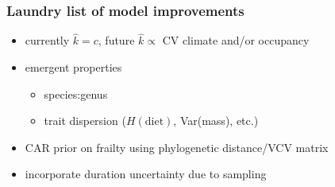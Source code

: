 \documentclass{beamer}
\begin{document}
\begin{frame}
  \frametitle{Laundry list of model improvements}

  \begin{itemize}
    \item currently \(\hat{k} = c\), future \(\hat{k} \propto\) CV climate and/or occupancy
    \item emergent properties 
      \begin{itemize}
        \item species:genus
        \item trait dispersion (\(H(\text{diet})\), Var(mass), etc.)
      \end{itemize}
    \item CAR prior on frailty using phylogenetic distance/VCV matrix
    \item incorporate duration uncertainty due to sampling 
  \end{itemize}

\end{frame}
\end{document}
